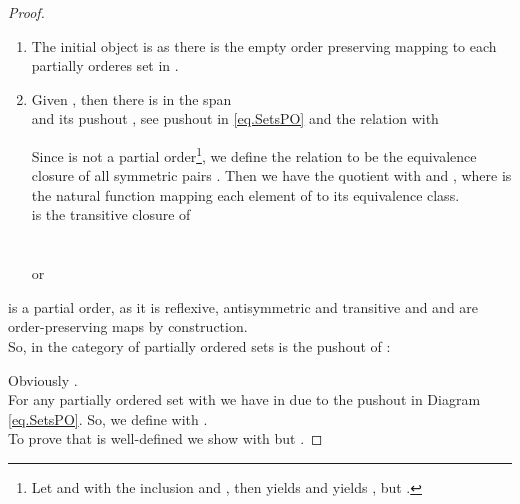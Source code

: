 \begin{proof}
\begin{enumerate}
	\item The initial object is  as there is the empty order preserving 
	mapping to each partially orderes set in \cPosets.
	
	\item Given , then 
	there is in  the span\\
	        and its pushout , see pushout  in \ref{eq.SetsPO}				
				 and the relation  with 
				
				
				Since  is not a partial order\footnote{Let  and  with  the inclusion and ,
								 then  yields  and  yields , but .
				        },
				we define the relation  to be the equivalence closure  of all
				symmetric pairs .  Then  we have the quotient
			    with  and , where  is the natural function mapping each element of  to its equivalence class.\\
  is the transitive closure of \\
								 \\ \hspace*{5mm}
											\\ \hspace*{3mm}
											or\\ \hspace*{5mm}
											
\end{enumerate}
        is a partial order, as it is reflexive, antisymmetric and transitive and  and  are order-preserving maps by construction.\\
So, in  the category of partially ordered sets   is the pushout of :
			
				
				
					
Obviously . \\
			For any partially ordered set  with
			 we have  in  due to the pushout  in Diagram \ref{eq.SetsPO}. So, we define  with . \\
To prove that  is well-defined we show  with  
			but 	.
			

\end{proof}
